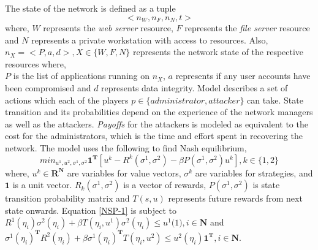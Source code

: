 \documentclass[conference]{IEEEtran}
\begin{document}
The state of the network is defined as a tuple
\begin{equation}
	<n_{W}, n_{F}, n_{N}, t>
\end{equation}
where,
$W$ represents the \textit{web server} resource, $F$ represents the \textit{file server} resource and $N$ represents a private workstation with access to resources.
Also, $n_{X} = <P,a,d>, X\in \{W, F, N\}$ represents the network state of the respective resources where,\\
$P$ is the list of applications running on $n_{X}$, $a$ represents if any user accounts have been compromised and $d$ represents data integrity.
Model describes a set of actions which each of the players $p \in \{administrator,attacker\}$ can take.
State transition and its probabilities depend on the experience of the network managers as well as the attackers.
\textit{Payoffs} for the attackers is modeled as equivalent to the cost for the administrators, which is the time and effort spent in recovering the network.
The model uses the following to find Nash equilibrium,
\begin{equation} \label{NSP-1}
	min_{u^{1},u^{2},\sigma^{1},\sigma^{2}} \mathbf{1}^{\mathbf{T}}[u^{k} - R^{k}(\sigma^{1},\sigma^{2}) - \beta P(\sigma^{1},\sigma^{2})u^{k}], k \in \{1,2\}
\end{equation}
where, $u^{k} \in \mathbf{R}^{\mathbf{N}}$ are variables for value vectors, $\sigma^{k}$ are variables for strategies, and $\mathbf{1}$ is a unit vector.
$R_{k}(\sigma^{1}, \sigma^{2})$ is a vector of rewards, $P(\sigma^{1}, \sigma^{2})$ is state transition probability matrix and $T(s,u)$ represents future rewards from next state onwards.
Equation \ref{NSP-1} is subject to\\
$R^{1}(\eta_{i})\sigma^{2}(\eta_{i}) + \beta T(\eta_{i},u^{1})\sigma^{2}(\eta_{i}) \le u^{1}\mathbf(1), i \in \mathbf{N}$ and \\
$\sigma^{1}(\eta_{i})^{\mathbf{T}}R^{2}(\eta_{i}) + \beta\sigma^{1}(\eta_{i})^{\mathbf{T}}T(\eta_{i},u^{2}) \le u^{2}(\eta_{i})\mathbf{1}^{\mathbf{T}}, i \in \mathbf{N}$.
\end{document}
